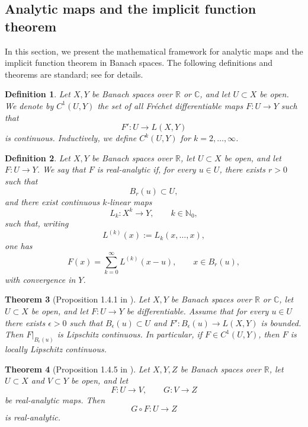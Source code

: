 \documentclass[12pt,oneside,reqno]{amsart}
\numberwithin{equation}{section}
\theoremstyle{plain}
\newtheorem{theorem}{Theorem}[section]
\newtheorem{definition}[theorem]{Definition}
\def\C{{\mathbb C}}
\def\N{{\mathbb N}}
\def\R{{\mathbb R}}
\begin{document}
\subsection{Analytic maps and the implicit function theorem}
\label{sec:appendix-analytic-maps}
In this section, we present the mathematical framework for analytic maps and the implicit function theorem in Banach spaces. The following definitions and theorems are standard; see \cite{herr2006well} for details.


\begin{definition}
Let $X,Y$ be Banach spaces over $\R$ or $\C$, and let $U\subset X$
be open. We denote by $C^1(U,Y)$ the set of all Fr\'echet
differentiable maps $F:U\to Y$ such that
\begin{equation}
    F':U\to L(X,Y)
\end{equation}
is continuous. Inductively, we define $C^k(U,Y)$ for
$k=2,\ldots,\infty$.
\end{definition}
\begin{definition}
Let $X,Y$ be Banach spaces over $\R$, let $U\subset X$ be open, and
let $F:U\to Y$. We say that $F$ is real-analytic if, for every
$u\in U$, there exists $r>0$ such that
\begin{equation}
    B_r(u)\subset U,
\end{equation}
and there exist continuous $k$-linear maps
\begin{equation}
    L_k:X^k\to Y,
    \qquad
    k\in\N_0,
\end{equation}
such that, writing
\begin{equation}
    L^{(k)}(x):=L_k(x,\ldots,x),
\end{equation}
one has
\begin{equation}
    F(x)
    =
    \sum_{k=0}^{\infty}
    L^{(k)}(x-u),
    \qquad
    x\in B_r(u),
\end{equation}
with convergence in $Y$.
\end{definition}



\begin{theorem}[Proposition 1.4.1 in \cite{herr2006well}]
Let $X,Y$ be Banach spaces over $\R$ or $\C$, let $U\subset X$ be open,
and let $F:U\to Y$ be differentiable. Assume that for every $u\in U$ there
exists $\epsilon>0$ such that $B_\epsilon(u)\subset U$ and
$F':B_\epsilon(u)\to L(X,Y)$ is bounded. Then
$F\big|_{B_\epsilon(u)}$ is Lipschitz continuous. In particular, if
$F\in C^1(U,Y)$, then $F$ is locally Lipschitz continuous.
\end{theorem}
\begin{theorem}[Proposition 1.4.5 in \cite{herr2006well}]
Let $X,Y,Z$ be Banach spaces over $\R$, let $U\subset X$ and
$V\subset Y$ be open, and let
\begin{equation}
    F:U\to V,
    \qquad
    G:V\to Z
\end{equation}
be real-analytic maps. Then
\begin{equation}
    G\circ F:U\to Z
\end{equation}
is real-analytic.
\end{theorem}
\end{document}
